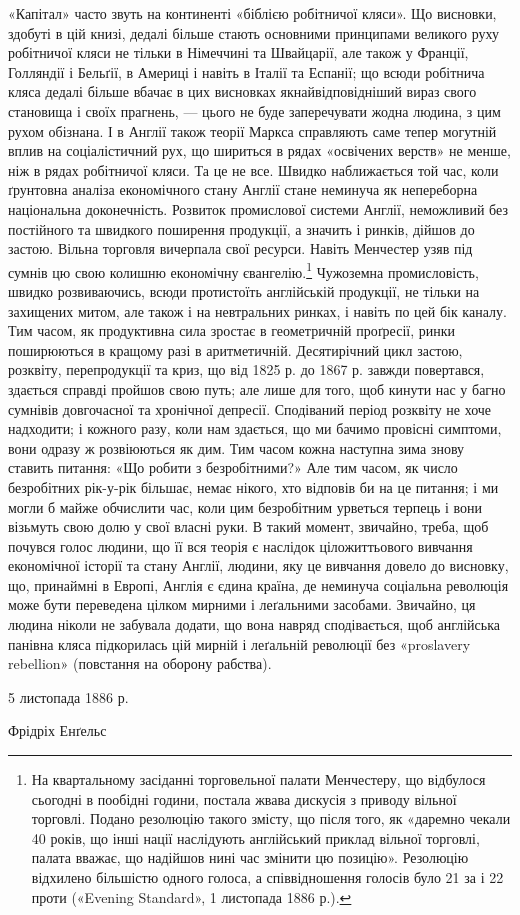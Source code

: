 «Капітал» часто звуть на континенті «біблією робітничої
кляси». Що висновки, здобуті в цій книзі, дедалі більше стають
основними принципами великого руху робітничої кляси не тільки
в Німеччині та Швайцарії, але також у Франції, Голляндії і
Бельґії, в Америці і навіть в Італії та Еспанії; що всюди робітнича
кляса дедалі більше вбачає в цих висновках якнайвідповідніший
вираз свого становища і своїх прагнень, — цього не буде
заперечувати жодна людина, з цим рухом обізнана. І в Англії також
теорії Маркса справляють саме тепер могутній вплив на соціалістичний
рух, що шириться в рядах «освічених верств» не менше,
ніж в рядах робітничої кляси. Та це не все. Швидко наближається
той час, коли ґрунтовна аналіза економічного стану Англії стане
неминуча як непереборна національна доконечність. Розвиток
промислової системи Англії, неможливий без постійного та швидкого
поширення продукції, а значить і ринків, дійшов до застою.
Вільна торговля вичерпала свої ресурси. Навіть Менчестер узяв
під сумнів цю свою колишню економічну євангелію.\footnote{
На квартальному засіданні торговельної палати Менчестеру, що
відбулося сьогодні в пообідні години, постала жвава дискусія з приводу
вільної торговлі. Подано резолюцію такого змісту, що після того, як
«даремно чекали 40 років, що інші нації наслідують англійський приклад
вільної торговлі, палата вважає, що надійшов нині час змінити цю позицію».
Резолюцію відхилено більшістю одного голоса, а співвідношення
голосів було 21 за і 22 проти («Evening Standard», 1 листопада 1886 р.).
} Чужоземна
промисловість, швидко розвиваючись, всюди протистоїть англійській
продукції, не тільки на захищених митом, але також і на
невтральних ринках, і навіть по цей бік каналу. Тим часом, як
продуктивна сила зростає в геометричній проґресії, ринки поширюються
в кращому разі в аритметичній. Десятирічний цикл
застою, розквіту, перепродукції та криз, що від 1825 р. до 1867 р.
завжди повертався, здається справді пройшов свою путь; але
лише для того, щоб кинути нас у багно сумнівів довгочасної та
хронічної депресії. Сподіваний період розквіту не хоче надходити;
і кожного разу, коли нам здається, що ми бачимо провісні
симптоми, вони одразу ж розвіюються як дим. Тим часом  кожна
наступна зима знову ставить питання: «Що робити з безробітними?»
Але тим часом, як число безробітних рік-у-рік більшає,
немає нікого, хто відповів би на це питання; і ми могли б майже
обчислити час, коли цим безробітним урветься терпець і вони
візьмуть свою долю у свої власні руки. В такий момент, звичайно,
треба, щоб почувся голос людини, що її вся теорія є наслідок
ціложиттьового вивчання економічної історії та стану Англії,
людини, яку це вивчання довело до висновку, що, принаймні в
Европі, Англія є єдина країна, де неминуча соціальна революція
може бути переведена цілком мирними і леґальними засобами.
Звичайно, ця людина ніколи не забувала додати, що вона навряд
сподівається, щоб англійська панівна кляса підкорилась цій
мирній і леґальній революції без «proslavery rebellion» (повстання
на оборону рабства).

5 листопада 1886 р.

Фрідріх Енґельс
